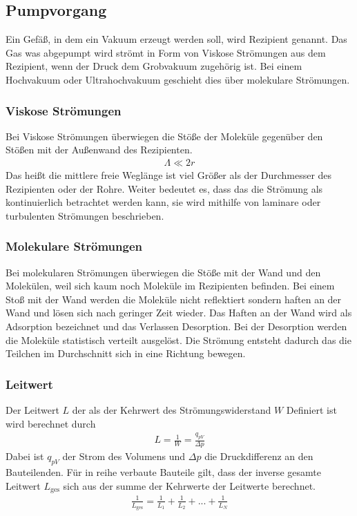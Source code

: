 \subsection{Pumpvorgang}
Ein Gefäß, in dem ein Vakuum erzeugt werden soll, wird Rezipient genannt. Das Gas was abgepumpt wird strömt in Form von Viskose Strömungen aus dem Rezipient, wenn der Druck dem Grobvakuum zugehörig ist. Bei einem Hochvakuum oder Ultrahochvakuum geschieht dies über molekulare Strömungen.
\subsubsection{Viskose Strömungen}
Bei Viskose Strömungen überwiegen die Stöße der Moleküle gegenüber den Stößen mit der Außenwand des Rezipienten.
\begin{align}
 \Lambda \ll 2 r
\end{align}
Das heißt die mittlere freie Weglänge ist viel Größer als der Durchmesser des Rezipienten oder der Rohre. Weiter bedeutet es, dass das die Strömung als kontinuierlich betrachtet werden kann, sie wird mithilfe von laminare oder turbulenten Strömungen beschrieben.
\subsubsection{Molekulare Strömungen}
Bei molekularen Strömungen überwiegen die Stöße mit der Wand und den Molekülen, weil sich kaum noch Moleküle im Rezipienten befinden. Bei einem Stoß mit der Wand werden die Moleküle nicht reflektiert sondern haften an der Wand und lösen sich nach geringer Zeit wieder. Das Haften an der Wand wird als Adsorption bezeichnet und das Verlassen Desorption.
Bei der Desorption werden die Moleküle statistisch verteilt ausgelöst. Die Strömung entsteht dadurch das die Teilchen im Durchschnitt sich in eine Richtung bewegen.
\subsubsection{Leitwert}
Der Leitwert $L$ der als der Kehrwert des Strömungswiderstand $W$ Definiert ist wird berechnet durch
\begin{align}
L=\frac{1}{W} = \frac{q_{pV}}{\Delta p}
\end{align}
Dabei ist $q_{pV}$ der Strom des Volumens und $\Delta p$ die Druckdifferenz an den Bauteilenden. Für in reihe verbaute Bauteile  gilt, dass der inverse gesamte Leitwert $L_\text{ges}$ sich aus der summe der Kehrwerte der Leitwerte berechnet.
 \begin{align}
 \frac{1}{L_\text{ges}}=\frac{1}{L_1}+\frac{1}{L_2}+...+\frac{1}{L_N}
 \end{align}
 
